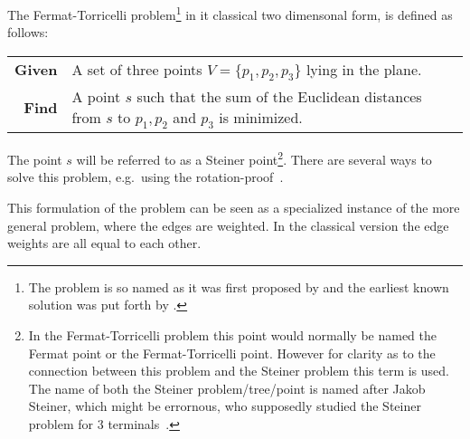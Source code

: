 The Fermat-Torricelli problem\footnote{The problem is so named as it was first
  proposed by \textcite{fermat1891} and the earliest known solution was put
  forth by \textcite{torricelli1919}.} in it classical two dimensonal form, is
defined as follows:
%
\begin{center}
\begin{tabular}{rp{9cm}}
  \toprule
  \textbf{Given} & A set of three points $V = \{p_1, p_2, p_3\}$ lying in the plane. \\
  \textbf{Find}  & A point $s$ such that the sum of the Euclidean distances from
                   $s$ to $p_1, p_2$ and $p_3$ is minimized. \\
  \bottomrule
\end{tabular}
\end{center}
%
The point $s$ will be referred to as a Steiner point\footnote{In the
  Fermat-Torricelli problem this point would normally be named the Fermat point
  or the Fermat-Torricelli point. However for clarity as to the connection
  between this problem and the Steiner problem this term is used. The name of
  both the Steiner problem/tree/point is named after Jakob Steiner, which might
  be errornous, who supposedly studied the Steiner problem for $3$
  terminals~\cite{brazil2014}.}. There are several ways to solve this problem,
e.g.\ using the rotation-proof~\cite[p.~3--5]{brazil2015}.

This formulation of the problem can be seen as a specialized instance of the
more general problem, where the edges are weighted. In the classical version the
edge weights are all equal to each other.

